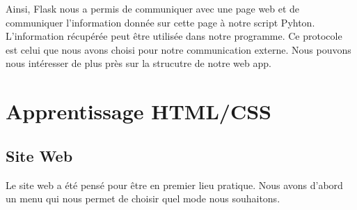 \documentclass[
	a4paper,									%
	11pt,										%
	twoside,									%
	openright,									%
	notitlepage,									%
	parskip=half,								%
]{scrreprt}										%
\begin{document}
Ainsi, Flask nous a permis de communiquer avec une page web et de communiquer l'information donnée sur cette page 
à notre script Pyhton. L'information récupérée peut être utilisée dans notre programme. 
Ce protocole est celui que nous avons choisi pour notre communication externe. Nous pouvons nous intéresser de plus 
près sur la strucutre de notre web app. \par

\chapter{Apprentissage HTML/CSS}

\section{Site Web}

Le site web a été pensé pour être en premier lieu pratique. Nous avons d'abord un menu qui nous permet de choisir 
quel mode nous souhaitons.
\end{document}
